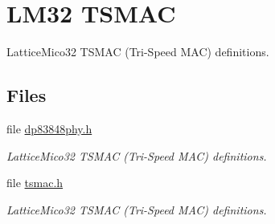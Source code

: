 \hypertarget{group__lm32__tsmac}{}\section{L\+M32 T\+S\+M\+AC}
\label{group__lm32__tsmac}


Lattice\+Mico32 T\+S\+M\+AC (Tri-\/\+Speed M\+AC) definitions.  


\subsection*{Files}
\begin{DoxyCompactItemize}
\item 
file \mbox{\hyperlink{dp83848phy_8h}{dp83848phy.\+h}}
\begin{DoxyCompactList}\small\item\em Lattice\+Mico32 T\+S\+M\+AC (Tri-\/\+Speed M\+AC) definitions. \end{DoxyCompactList}\item 
file \mbox{\hyperlink{tsmac_8h}{tsmac.\+h}}
\begin{DoxyCompactList}\small\item\em Lattice\+Mico32 T\+S\+M\+AC (Tri-\/\+Speed M\+AC) definitions. \end{DoxyCompactList}\end{DoxyCompactItemize}
